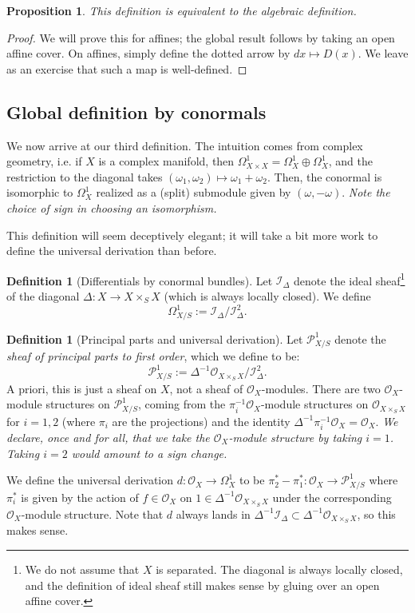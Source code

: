 \documentclass[10pt]{article}
\newtheorem{prop}[thm]{Proposition}
\theoremstyle{definition}
\newtheorem{defn}[thm]{Definition}
\newcommand{\OO}{\mathcal{O}}
\begin{document}
\begin{prop}
This definition is equivalent to the algebraic definition.
\end{prop}
\begin{proof}
We will prove this for affines; the global result follows by taking an open affine cover.  On affines, simply define the dotted arrow by $dx \mapsto D(x)$.  We leave as an exercise that such a map is well-defined.
\end{proof}

\subsection{Global definition by conormals}

We now arrive at our third definition.   The intuition comes from complex geometry, i.e. if $X$ is a complex manifold, then $\Omega^1_{X \times X} = \Omega^1_X \oplus \Omega^1_X$, and the restriction to the diagonal takes $(\omega_1, \omega_2) \mapsto \omega_1 + \omega_2$.  Then, the conormal is isomorphic to $\Omega^1_X$ realized as a (split) submodule given by $(\omega, -\omega)$.  \emph{Note the choice of sign in choosing an isomorphism.}

This definition will seem deceptively elegant; it will take a bit more work to define the universal derivation than before.
\begin{defn}[Differentials by conormal bundles]
Let $\mathcal{I}_\Delta$ denote the ideal sheaf\footnote{We do not assume that $X$ is separated.  The diagonal is always locally closed, and the definition of ideal sheaf still makes sense by gluing over an open affine cover.} of the diagonal $\Delta: X \rightarrow X \times_S X$ (which is always locally closed).  We define
$$\Omega^1_{X/S} := \mathcal{I}_\Delta/\mathcal{I}_\Delta^2.$$
\end{defn}

\begin{defn}[Principal parts and universal derivation]
Let $\mathcal{P}^1_{X/S}$ denote the \emph{sheaf of principal parts to first order}, which we define to be:
$$\mathcal{P}^1_{X/S} := \Delta^{-1} \OO_{X \times_S X}/\mathcal{I}^2_{\Delta}.$$
A priori, this is just a sheaf on $X$, not a sheaf of $\OO_X$-modules.  There are two $\OO_X$-module structures on $\mathcal{P}^1_{X/S}$, coming from the $\pi_i^{-1}\OO_X$-module structures on $\OO_{X \times_S X}$ for $i=1,2$ (where $\pi_i$ are the projections) and the identity $\Delta^{-1} \pi_i^{-1} \OO_X = \OO_X$.  \emph{We declare, once and for all, that we take the $\OO_X$-module structure by taking $i=1$.  Taking $i=2$ would amount to a sign change.}

We define the universal derivation $d: \OO_X \rightarrow \Omega^1_X$ to be $\pi_2^* - \pi_1^*: \OO_X \rightarrow \mathcal{P}^1_{X/S}$ where $\pi_i^*$ is given by the action of $f \in \OO_X$ on $1 \in \Delta^{-1}\OO_{X \times_S X}$ under the corresponding $\OO_X$-module structure.  Note that $d$ always lands in $\Delta^{-1} \mathcal{I}_\Delta \subset \Delta^{-1} \OO_{X \times_S X}$, so this makes sense.
\end{defn}
\end{document}

